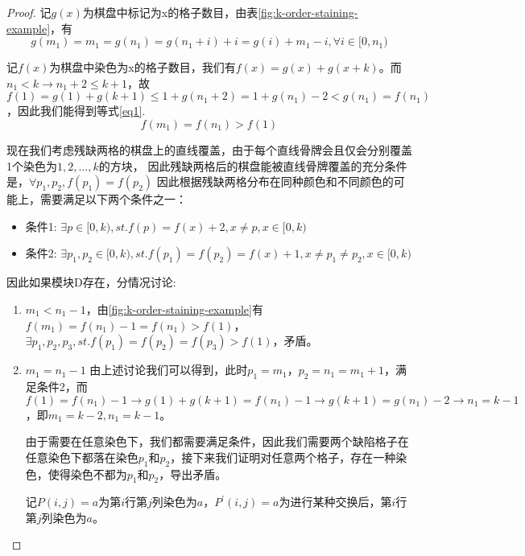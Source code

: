 \begin{proof}
    记$g(x)$为棋盘中标记为x的格子数目，由表\ref{fig:k-order-staining-example}，有
    \begin{equation}
        g(m_1) = m_1 = g(n_1) = g(n_1 + i) + i = g(i) + m_1 - i, \forall i \in [0, n_1)
    \end{equation}

    记$f(x)$为棋盘中染色为x的格子数目，我们有$f(x) = g(x) + g(x + k)$。而$n_1 < k \rightarrow n_1 + 2 \le k + 1$，故
    $f(1) = g(1) + g(k + 1) \le 1 + g(n_1 + 2) = 1 + g(n_1) - 2 < g(n_1) = f(n_1)$
    ，因此我们能得到等式\ref{eq1}.
    \begin{equation}
        \label{eq1}
        f(m_1) = f(n_1) > f(1)
    \end{equation}

    现在我们考虑残缺两格的棋盘上的直线覆盖，由于每个直线骨牌会且仅会分别覆盖1个染色为$1, 2, ... ,k$的方块，
    因此残缺两格后的棋盘能被直线骨牌覆盖的充分条件是，$\forall p_1, p_2, f(p_1) = f(p_2)$
    因此根据残缺两格分布在同种颜色和不同颜色的可能上，需要满足以下两个条件之一：

    \begin{itemize}
        \item 条件1: $\exists p \in [0, k), st. f(p) = f(x) + 2, x \neq p , x \in [0, k)$
        \item 条件2: $\exists p_1, p_2 \in [0, k), st. f(p_1) = f(p_2) = f(x) + 1, x \neq p_1 \neq p_2, x \in [0, k)$
    \end{itemize}

    因此如果模块D存在，分情况讨论:

    \begin{enumerate}
        \item $m_1 < n_1 - 1$，由\ref{fig:k-order-staining-example}有$f(m_1) = f(n_1) - 1 = f(n_1) > f(1)$，$\exists p_1, p_2, p_3, st. f(p_1) = f(p_2) = f(p_3) > f(1)$，矛盾。
        \item $m_1 = n_1 - 1$ 由上述讨论我们可以得到，此时$p_1 = m_1$，$p_2 = n_1 = m_1 + 1$，满足条件2，而$f(1) = f(n_1) - 1 \rightarrow g(1) + g(k + 1) = f(n_1) - 1 \rightarrow g(k + 1) = g(n_1) - 2 \rightarrow n_1 = k - 1$
              ，即$m_1 = k - 2, n_1 = k - 1$。

              由于需要在任意染色下，我们都需要满足条件，因此我们需要两个缺陷格子在任意染色下都落在染色$p_1$和$p_2$，接下来我们证明对任意两个格子，存在一种染色，使得染色不都为$p_1$和$p_2$，导出矛盾。
              
              记$P(i, j) = a$为第$i$行第$j$列染色为$a$，$P^{'}(i, j) = a$为进行某种交换后，第$i$行第$j$列染色为$a$。


\end{enumerate}
\end{proof}
